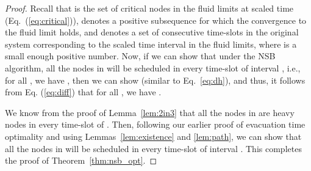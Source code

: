 \documentclass[10pt,journal,compsoc]{IEEEtran}
\begin{document}
\begin{proof}
Recall that  is the set of critical nodes in the fluid limits at scaled time  (Eq.~(\ref{eq:critical})),
 denotes a positive subsequence for which the convergence to the fluid limit holds,
and  denotes 
a set of consecutive time-slots in the original system corresponding to the scaled time interval  
in the fluid limits, where  is a small enough positive number. Now, if we can show that under 
the NSB algorithm, all the nodes in  will be scheduled in every time-slot of interval , i.e.,
for all , we have , then we can show  (similar to Eq.~\eqref{eq:dh}),
and thus, it follows from Eq. (\ref{eq:diff}) that for all , we have .

We know from the proof of Lemma~\ref{lem:2in3} that all the nodes in  are heavy nodes in 
every time-slot of . Then, following our earlier proof of evacuation time optimality and using 
Lemmas~\ref{lem:existence} and \ref{lem:path}, we can show that all the nodes in  will be 
scheduled in every time-slot of interval . This completes the proof of Theorem~\ref{thm:nsb_opt}.
\end{proof}
\end{document}
